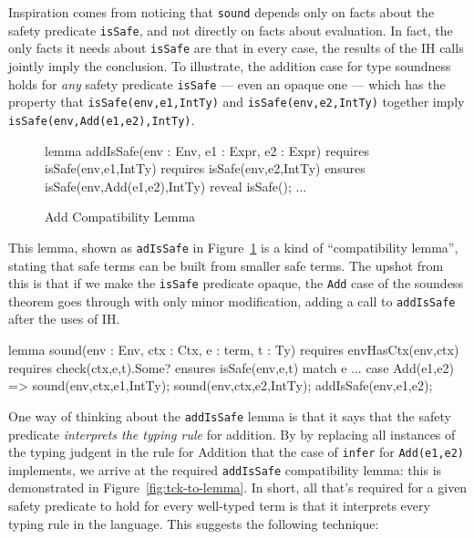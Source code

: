 \documentclass[sigplan,review,screen,anonymous]{acmart}
\begin{document}
Inspiration comes from noticing that \texttt{sound} depends only on
facts about the safety predicate \texttt{isSafe}, and not directly
on facts about evaluation. In fact, the only facts it needs about \texttt{isSafe}
are that in every case, the results of the IH calls jointly imply the conclusion.
To illustrate, the addition case for type soundness holds
for \emph{any} safety predicate \texttt{isSafe} --- even an opaque one --- which has the property
that \texttt{isSafe(env,e1,IntTy)} and \texttt{isSafe(env,e2,IntTy)}
together imply \texttt{isSafe(env,Add(e1,e2),IntTy)}.


\begin{figure}
\begin{dafny}
lemma addIsSafe(env : Env, e1 : Expr, e2 : Expr)
  requires isSafe(env,e1,IntTy)
  requires isSafe(env,e2,IntTy)
  ensures isSafe(env,Add(e1,e2),IntTy)
{reveal isSafe(); ...}
\end{dafny}
  \caption{Add Compatibility Lemma}
  \label{fig:add-is-safe}
\end{figure}

This lemma, shown as \texttt{adIsSafe} in Figure~\ref{fig:add-is-safe} is a kind
of ``compatibility lemma'', stating that safe terms can be built from smaller
safe terms.  The upshot from this is that if we make the \texttt{isSafe}
predicate opaque, the \texttt{Add} case of the soundess theorem goes through
with only minor modification, adding a call to \texttt{addIsSafe} after the uses
of IH.

\begin{dafny}
lemma sound(env : Env, ctx : Ctx, e : term, t : Ty)
  requires envHasCtx(env,ctx)
  requires check(ctx,e,t).Some?
  ensures isSafe(env,e,t)
{
  match e {
    ...
    case Add(e1,e2) =>
      sound(env,ctx,e1,IntTy);
      sound(env,ctx,e2,IntTy);
      addIsSafe(env,e1,e2);
  }
}
\end{dafny}

One way of thinking about the \texttt{addIsSafe} lemma is that it says that the
safety predicate \emph{interprets the typing rule} for addition. By by replacing
all instances of the typing judgent in the rule for Addition that the case of \texttt{infer}
for \texttt{Add(e1,e2)} implements, we arrive at the required \texttt{addIsSafe} compatibility lemma:
this is demonstrated in Figure~\ref{fig:tck-to-lemma}.  In short, all that's required for a given safety predicate to hold for every well-typed term is
that it interprets every typing rule in the language. This suggests the following technique:
\end{document}
